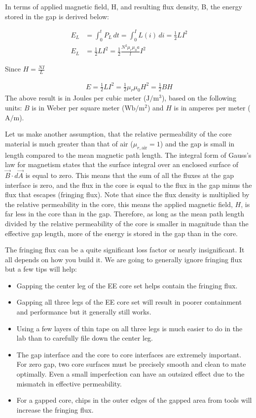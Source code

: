 \documentclass{article}
\begin{document}
In terms of applied magnetic field, H, and resulting flux density, B, the energy
stored in the gap is derived below:

\begin{align}
    E_L &= \int_{0}^{t} P_L \, dt = \int_{0}^{I} L(i) \, di = \frac{1}{2} LI^2 \\
    E_L &= \frac{1}{2} LI^2 = \frac{1}{2} \frac{N^2 \mu_r \mu_0 a}{l} I^2
    \label{eq:energy1}
\end{align}

Since $H = \frac{N I}{L}$

\begin{align}
E = \frac{1}{2} L I^2 = \frac{1}{2} \mu_r \mu_0 H^2 = \frac{1}{2} B H
\label{eq:energy2}
\end{align}
The above result is in Joules per cubic meter (\(\text{J}/\text{m}^3\)), based on the following units: \(B\) is in Weber per square meter (\(\text{Wb}/\text{m}^2\)) and \(H\) is in amperes per meter (\(\text{A}/\text{m}\)).

Let us make another assumption, that the relative permeability of the core material is much greater than that of air (\(\mu_{r,\text{air}} = 1\)) and the gap is small in length compared to the mean magnetic path length.
The integral form of Gauss’s law for magnetism states that the surface integral over an enclosed surface of \( \vec{B} \cdot d\vec{A} \) is equal to zero.
This means that the sum of all the fluxes at the gap interface is zero, and the flux in the core is equal to the flux in the gap minus the flux that escapes (fringing flux).
Note that since the flux density is multiplied by the relative permeability in the core, this means the applied magnetic field, \(H\), is far less in the core than in the gap.
Therefore, as long as the mean path length divided by the relative permeability of the core is smaller in magnitude than the effective gap length, more of the energy is stored in the gap than in the core.

The fringing flux can be a quite significant loss factor or nearly insignificant.  It all depends on how you build it.  We are going to generally ignore fringing flux but a few tips will help:
\begin{itemize}
    \item Gapping the center leg of the EE core set helps contain the fringing flux.
    \item Gapping all three legs of the EE core set will result in poorer containment and performance but it generally still works.
    \item Using a few layers of thin tape on all three legs is much easier to do in the lab than to carefully file down the center leg.
    \item The gap interface and the core to core interfaces are extremely important.  For zero gap, two core surfaces must be precisely smooth and clean to mate optimally.  Even a small imperfection can have an outsized effect due to the mismatch in effective permeability.
    \item For a gapped core, chips in the outer edges of the gapped area from tools will increase the fringing flux.
\end{itemize}
\end{document}
